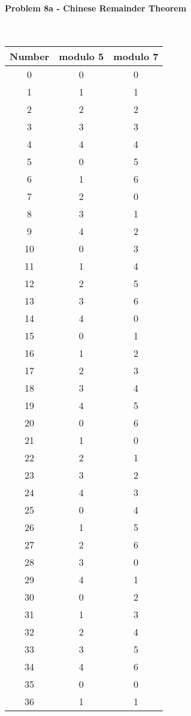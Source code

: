 \documentclass[fleqn]{article}
\begin{document}
\paragraph{Problem 8a - Chinese Remainder Theorem} ~\\
\begin{table}[ht]
	\begin{tabular}{c c c}
	\hline\hline
	Number & modulo 5 & modulo 7\\ [0.5ex]
	\hline
	0 & 0 & 0 \\
	1 & 1 & 1 \\
	2 & 2 & 2 \\
	3 & 3 & 3 \\
	4 & 4 & 4 \\
	5 & 0 & 5 \\
	6 & 1 & 6 \\
	7 & 2 & 0 \\
	8 & 3 & 1 \\
	9 & 4 & 2 \\
	10 & 0 & 3 \\
	11 & 1 & 4 \\
	12 & 2 & 5 \\
	13 & 3 & 6 \\
	14 & 4 & 0 \\
	15 & 0 & 1 \\
	16 & 1 & 2 \\
	17 & 2 & 3 \\
	18 & 3 & 4 \\
	19 & 4 & 5 \\
	20 & 0 & 6 \\
	21 & 1 & 0 \\
	22 & 2 & 1 \\
	23 & 3 & 2 \\
	24 & 4 & 3 \\
	25 & 0 & 4 \\
	26 & 1 & 5 \\
	27 & 2 & 6 \\
	28 & 3 & 0 \\
	29 & 4 & 1 \\
	30 & 0 & 2 \\
	31 & 1 & 3 \\
	32 & 2 & 4 \\
	33 & 3 & 5 \\
	34 & 4 & 6 \\
	35 & 0 & 0 \\
	36 & 1 & 1
	\end{tabular}
\end{table}
\end{document}
